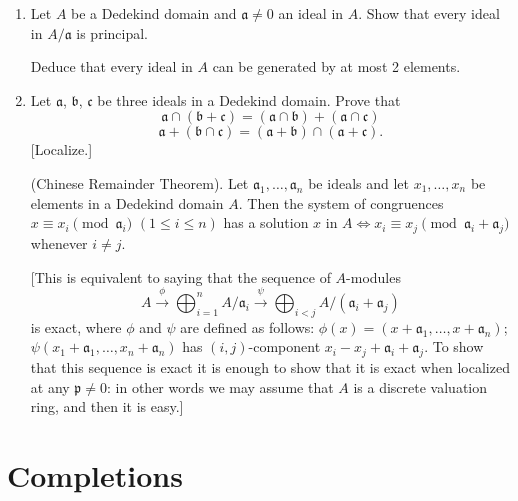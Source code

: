 \begin{enumerate}
\item Let $A$ be a Dedekind domain and $\mathfrak a\neq0$ an ideal in $A$. Show that every ideal in $A/\mathfrak a$ is principal.

Deduce that every ideal in $A$ can be generated by at most 2 elements.

\item Let $\mathfrak a$, $\mathfrak b$, $\mathfrak c$ be three ideals in a Dedekind domain. Prove that
\[
 \mathfrak a\cap(\mathfrak b+\mathfrak c)=(\mathfrak a\cap\mathfrak b)+(\mathfrak a\cap\mathfrak c)
\]
\[
 \mathfrak a+(\mathfrak b\cap\mathfrak c)=(\mathfrak a+\mathfrak b)\cap(\mathfrak a+\mathfrak c).
\]
[Localize.]

\amstaritem (Chinese Remainder Theorem). Let $\mathfrak a_1,\ldots,\mathfrak a_n$ be ideals and let $x_1,\ldots,x_n$ be elements in a Dedekind domain $A$. Then the system of congruences $x\equiv x_i\pmod{\mathfrak a_i}$ $(1\leq i\leq n)$ has a solution $x$ in $A\Longleftrightarrow x_i\equiv x_j\pmod{\mathfrak a_i+\mathfrak a_j}$ whenever $i\neq j$.

[This is equivalent to saying that the sequence of $A$-modules
\[
 A\xrightarrow{\phi}\bigoplus_{i=1}^n A/\mathfrak a_i\xrightarrow{\psi}\bigoplus_{i<j}A/(\mathfrak a_i+\mathfrak a_j)
\]
is exact, where $\phi$ and $\psi$ are defined as follows:
$\phi(x)=(x+\mathfrak a_1,\ldots,x+\mathfrak a_n)$; $\psi(x_1+\mathfrak a_1,\ldots,x_n+\mathfrak a_n)$ has $(i,j)$-component $x_i-x_j+\mathfrak a_i+\mathfrak a_j$. To show that this sequence is exact it is enough to show that it is exact when localized at any $\mathfrak p\neq0$: in other words we may assume that $A$ is a discrete valuation ring, and then it is easy.]
\end{enumerate}

\section{Completions}

